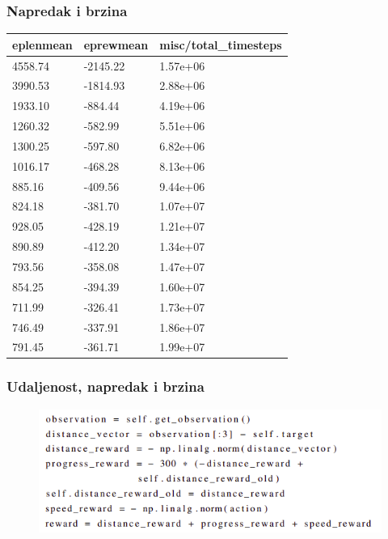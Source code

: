 \documentclass{beamer}
\begin{document}
\begin{frame}
	\frametitle{Napredak i brzina}

	\begin{table}[ht!]
		\centering
		\label{tab:rub}
		\begin{tabular}{@{}lll@{}}
			\hline
			eplenmean & eprewmean & misc/total\_timesteps \\
			\hline
			\hline
			4558.74   & -2145.22  & 1.57e+06              \\
			3990.53   & -1814.93  & 2.88e+06              \\
			1933.10   & -884.44   & 4.19e+06              \\
			1260.32   & -582.99   & 5.51e+06              \\
			1300.25   & -597.80   & 6.82e+06              \\
			1016.17   & -468.28   & 8.13e+06              \\
			885.16    & -409.56   & 9.44e+06              \\
			824.18    & -381.70   & 1.07e+07              \\
			928.05    & -428.19   & 1.21e+07              \\
			890.89    & -412.20   & 1.34e+07              \\
			793.56    & -358.08   & 1.47e+07              \\
			854.25    & -394.39   & 1.60e+07              \\
			711.99    & -326.41   & 1.73e+07              \\
			746.49    & -337.91   & 1.86e+07              \\
			791.45    & -361.71   & 1.99e+07              \\
			\hline
		\end{tabular}
	\end{table}

\end{frame}

\begin{frame}
	\frametitle{Udaljenost, napredak i brzina}

	\begin{figure}[h!]
		\centering
		\includegraphics[width=\columnwidth]{img/unb.png}
	\end{figure}

\end{frame}
\end{document}
